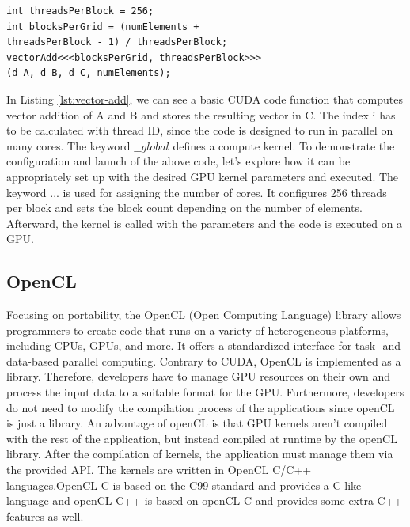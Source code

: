 \documentclass[conference]{IEEEtran}
\begin{document}
\begin{lstlisting}[label=lst:launch, basicstyle=\ttfamily\small, mathescape=true, captionpos=b, caption={This listing illustrates how a GPU kernel in CUDA can be started after configuring the kernel parameters.}]
int threadsPerBlock = 256;
int blocksPerGrid = (numElements +
threadsPerBlock - 1) / threadsPerBlock;
vectorAdd<<<blocksPerGrid, threadsPerBlock>>>
(d_A, d_B, d_C, numElements);
\end{lstlisting}
In Listing \ref{lst:vector-add}, we can see a basic CUDA code function that computes vector addition of A and B and stores the resulting vector in C. The index i has to be calculated with thread ID, since the code is designed to run in parallel on many cores. The keyword $ \_\_global $ defines a compute kernel. To demonstrate the configuration and launch of the above code, let's explore how it can be appropriately set up with the desired GPU kernel parameters and executed. The keyword \textlangle\textlangle\textlangle...\textrangle\textrangle\textrangle
 is used for assigning the number of cores. It configures 256 threads per block and sets the block count depending on the number of elements. Afterward, the kernel is called with the parameters and the code is executed on a GPU. \cite{b25}
 \vspace{\baselineskip}





\vspace{\baselineskip}


\subsection{OpenCL}
Focusing on portability, the OpenCL (Open Computing Language) library allows programmers to create code that runs on a variety of heterogeneous platforms, including CPUs, GPUs, and more. It offers a standardized interface for task- and data-based parallel computing. Contrary to CUDA, OpenCL is implemented as a library. Therefore, developers have to manage GPU resources on their own and process the input data to a suitable format for the GPU. Furthermore, developers do not need to modify the compilation process of the applications since openCL is just a library. An advantage of openCL is that GPU kernels aren't compiled with the rest of the application, but instead compiled at runtime by the openCL library. After the compilation of kernels, the application must manage them via the provided API. The kernels are written in OpenCL C/C++ languages.OpenCL C is based on the C99 standard and provides a C-like language and openCL C++ is based on openCL C and provides some extra C++ features as well. \cite{b4}
\end{document}
